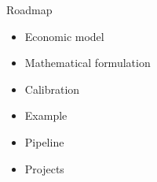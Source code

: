 \begin{frame}{Roadmap}\vspace{0.25cm}



	\begin{multicols}{2}

		\begin{itemize}\setlength\itemsep{1em}
	\item Economic model
	\item Mathematical formulation
	\item Calibration
	\end{itemize}

	    \pause

		\begin{itemize}\setlength\itemsep{1em}
			\item Example
			\item Pipeline
			\item Projects
			\end{itemize}

	\end{multicols}

\end{frame}
